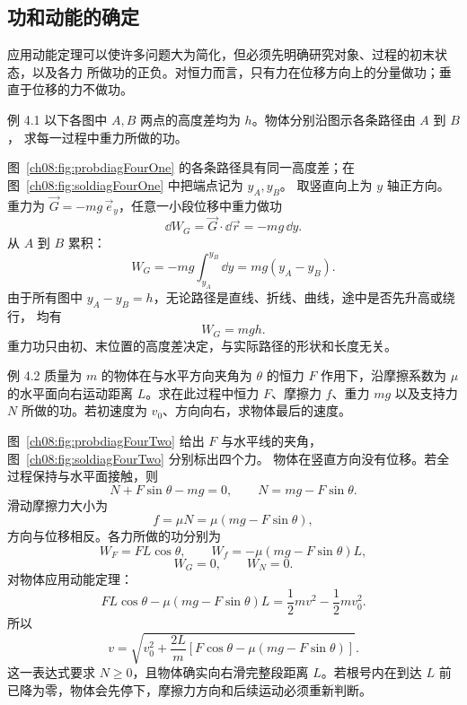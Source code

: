 \subsection{功和动能的确定}

应用动能定理可以使许多问题大为简化，但必须先明确研究对象、过程的初末状态，以及各力
所做功的正负。对恒力而言，只有力在位移方向上的分量做功；垂直于位移的力不做功。



\begin{origexamplebox}{例 4.1}
以下各图中 $A,B$ 两点的高度差均为 $h$。物体分别沿图示各条路径由 $A$ 到 $B$，
求每一过程中重力所做的功。
\probdiagFourOne
\end{origexamplebox}

\begin{xesolution}
图~\ref{ch08:fig:probdiagFourOne} 的各条路径具有同一高度差；在图~\ref{ch08:fig:soldiagFourOne} 中把端点记为 $y_A,y_B$。
取竖直向上为 $y$ 轴正方向。重力为 $\vec G=-mg\,\vec e_y$，任意一小段位移中重力做功
\[
 \dd W_G=\vec G\cdot\dd\vec r=-mg\,\dd y.
\]
从 $A$ 到 $B$ 累积：
\[
 W_G=-mg\int_{y_A}^{y_B}\dd y
 =mg(y_A-y_B).
\]
\soldiagFourOne
由于所有图中 $y_A-y_B=h$，无论路径是直线、折线、曲线，途中是否先升高或绕行，
均有
\[
 \boxed{W_G=mgh}.
\]
重力功只由初、末位置的高度差决定，与实际路径的形状和长度无关。
\end{xesolution}

\Needspace{0.34\textheight}
\begin{origexamplebox}{例 4.2}
质量为 $m$ 的物体在与水平方向夹角为 $\theta$ 的恒力 $F$ 作用下，沿摩擦系数为
$\mu$ 的水平面向右运动距离 $L$。求在此过程中恒力 $F$、摩擦力 $f$、重力 $mg$
以及支持力 $N$ 所做的功。若初速度为 $v_0$、方向向右，求物体最后的速度。
\probdiagFourTwo
\end{origexamplebox}

\begin{xesolution}
图~\ref{ch08:fig:probdiagFourTwo} 给出 $F$ 与水平线的夹角，图~\ref{ch08:fig:soldiagFourTwo} 分别标出四个力。
物体在竖直方向没有位移。若全过程保持与水平面接触，则
\[
 N+F\sin\theta-mg=0,
 \qquad
 N=mg-F\sin\theta.
\]
滑动摩擦力大小为
\[
 f=\mu N=\mu(mg-F\sin\theta),
\]
方向与位移相反。各力所做的功分别为
\[
 \boxed{W_F=FL\cos\theta},
 \qquad
 \boxed{W_f=-\mu(mg-F\sin\theta)L},
\]
\[
 \boxed{W_G=0},
 \qquad
 \boxed{W_N=0}.
\]
\soldiagFourTwo
对物体应用动能定理：
\[
 FL\cos\theta-\mu(mg-F\sin\theta)L
 =\frac12mv^2-\frac12mv_0^2.
\]
所以
\[
 \boxed{
 v=\sqrt{v_0^2+\frac{2L}{m}
 \left[F\cos\theta-\mu(mg-F\sin\theta)\right]}}.
\]
这一表达式要求 $N\ge0$，且物体确实向右滑完整段距离 $L$。若根号内在到达 $L$ 前
已降为零，物体会先停下，摩擦力方向和后续运动必须重新判断。
\end{xesolution}

